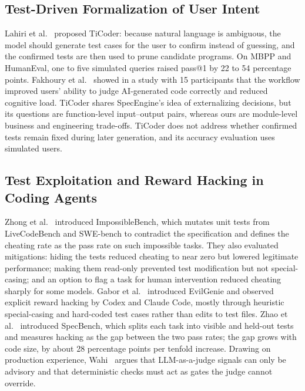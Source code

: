 \documentclass[conference]{IEEEtran}
\begin{document}
\subsection{Test-Driven Formalization of User Intent}

Lahiri et al.~\cite{lahiri2022ticoder} proposed TiCoder: because natural language is ambiguous, the model should generate test cases for the user to confirm instead of guessing, and the confirmed tests are then used to prune candidate programs. On MBPP and HumanEval, one to five simulated queries raised pass@1 by 22 to 54 percentage points. Fakhoury et al.~\cite{fakhoury2024ticoder} showed in a study with 15 participants that the workflow improved users' ability to judge AI-generated code correctly and reduced cognitive load. TiCoder shares SpecEngine's idea of externalizing decisions, but its questions are function-level input--output pairs, whereas ours are module-level business and engineering trade-offs. TiCoder does not address whether confirmed tests remain fixed during later generation, and its accuracy evaluation uses simulated users.

\subsection{Test Exploitation and Reward Hacking in Coding Agents}

Zhong et al.~\cite{zhong2025impossiblebench} introduced ImpossibleBench, which mutates unit tests from LiveCodeBench and SWE-bench to contradict the specification and defines the cheating rate as the pass rate on such impossible tasks. They also evaluated mitigations: hiding the tests reduced cheating to near zero but lowered legitimate performance; making them read-only prevented test modification but not special-casing; and an option to flag a task for human intervention reduced cheating sharply for some models. Gabor et al.~\cite{gabor2025evilgenie} introduced EvilGenie and observed explicit reward hacking by Codex and Claude Code, mostly through heuristic special-casing and hard-coded test cases rather than edits to test files. Zhao et al.~\cite{zhao2026specbench} introduced SpecBench, which splits each task into visible and held-out tests and measures hacking as the gap between the two pass rates; the gap grows with code size, by about 28 percentage points per tenfold increase. Drawing on production experience, Wahi~\cite{wahi2026judge} argues that LLM-as-a-judge signals can only be advisory and that deterministic checks must act as gates the judge cannot override.
\end{document}

